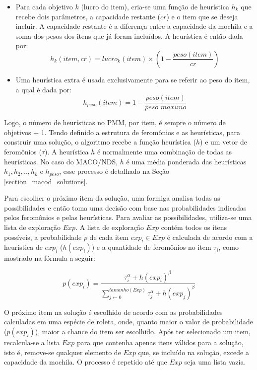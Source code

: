 \begin{itemize}
	\item Para cada objetivo $k$ (lucro do item), cria-se uma função de heurística $h_k$ que recebe dois parâmetros, a capacidade restante ($cr$) e o item que se deseja incluir. A capacidade restante é a diferença entre a capacidade da mochila e a soma dos pesos dos itens que já foram incluídos. A heurística é então dada por: \begin{equation}h_k(item, cr) = lucro_k(item) \times (1 - \frac{peso(item)}{cr})\end{equation}
	\item Uma heurística extra é usada exclusivamente para se referir ao peso do item, a qual é dada por: \begin{equation}h_{peso}(item) = 1 - \frac{peso(item)}{peso\_maximo}\end{equation}
\end{itemize}

Logo, o número de heurísticas no PMM, por item, é sempre o número de objetivos + 1. Tendo definido a estrutura de feromônios e as heurísticas, para construir uma solução, o algoritmo recebe a função heurística ($h$) e um vetor de feromônios ($\tau$). A heurística $h$ é normalmente uma combinação de todas as heurísticas. No caso do MACO/NDS, $h$ é uma média ponderada das heurísticas $h_1, h_2, .., h_k$ e $h_{peso}$, esse processo é detalhado na Seção \ref{section_macod_solutions}.

Para escolher o próximo item da solução, uma formiga analisa todas as possibilidades e então toma uma decisão com base nas probabilidades indicadas pelos feromônios e pelas heurísticas. Para avaliar as possibilidades, utiliza-se uma lista de exploração $Exp$. A lista de exploração $Exp$ contém todos os itens possíveis, a probabilidade $p$ de cada item $exp_i \in Exp$ é calculada de acordo com a heurística de $exp_i$ ($h(exp_i)$) e a quantidade de feromônios no item $\tau_i$, como mostrado na fórmula a seguir:

\begin{equation}p(exp_i) = \frac{\tau_i^\alpha + h(exp_i)^\beta}{\sum_{j \gets 0}^{tamanho(Exp)} \tau_j^\alpha + h(exp_j)^\beta}\end{equation}

O próximo item na solução é escolhido de acordo com as probabilidades calculadas em uma espécie de roleta, onde, quanto maior o valor de probabilidade ($p(exp_i)$), maior a chance do item ser escolhido. Após ter selecionado um item, recalcula-se a lista $Exp$ para que contenha apenas itens válidos para a solução, isto é, remove-se qualquer elemento de $Exp$ que, se incluído na solução, excede a capacidade da mochila. O processo é repetido até que $Exp$ seja uma lista vazia.

